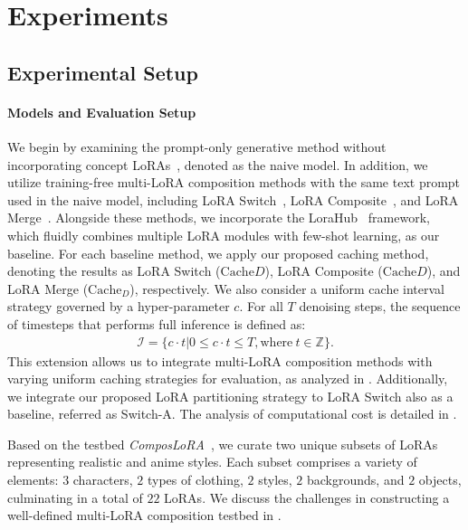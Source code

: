\vspace{-8pt}
\section{Experiments}
\vspace{-4pt}
\subsection{Experimental Setup}
\vspace{-2pt}
\paragraph{Models and Evaluation Setup}
We begin by examining the prompt-only generative method without incorporating concept LoRAs~\citep{sd1.5}, denoted as the naive model. In addition, we utilize training-free multi-LoRA composition methods with the same text prompt used in the naive model, including LoRA Switch~\citep{multilora}, LoRA Composite~\citep{multilora}, and LoRA Merge~\citep{loramerge}. Alongside these methods, we incorporate the LoraHub~\citep{lorahub} framework, which fluidly combines multiple LoRA modules with few-shot learning, as our baseline. For each baseline method, we apply our proposed caching method, denoting the results as LoRA Switch ($\text{Cache}{D}$), LoRA Composite ($\text{Cache}{D}$), and LoRA Merge ($\text{Cache}_{D}$), respectively. We also consider a uniform cache interval strategy governed by a hyper-parameter $c$. For all $T$ denoising steps, the sequence of timesteps that performs full inference is defined as:
\begin{equation}
\begin{aligned}
    \label{cache interval1}
    \mathcal{I} = \{c\cdot t|0\leq c\cdot t\leq T, \text{where} \ t\in \mathbb{Z}\}.
\end{aligned}
\end{equation}
This extension allows us to integrate multi-LoRA composition methods with varying uniform caching strategies for evaluation, as analyzed in . Additionally, we integrate our proposed LoRA partitioning strategy to LoRA Switch also as a baseline, referred as Switch-A. The analysis of computational cost is detailed in .

Based on the testbed \textit{ComposLoRA}~\citep{multilora}, we curate two unique subsets of LoRAs representing realistic and anime styles. Each subset comprises a variety of elements: $3$ characters, $2$ types of clothing, $2$ styles, $2$ backgrounds, and $2$ objects, culminating in a total of $22$ LoRAs. We discuss the challenges in constructing a well-defined multi-LoRA composition testbed in .

